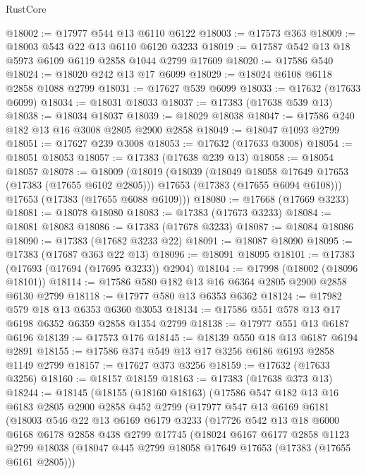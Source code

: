 \begin{lexlean}{RustCore}
\begin{coremodule}
@18002 := @17977 @544 @13 @6110 @6122
@18003 := @17573 @363
@18009 := @18003 @543 @22 @13 @6110 @6120 @3233
@18019 := @17587 @542 @13 @18 @5973 @6109 @6119 @2858 @1044 @2799 @17609
@18020 := @17586 @540
@18024 := @18020 @242 @13 @17 @6099
@18029 := @18024 @6108 @6118 @2858 @1088 @2799
@18031 := @17627 @539 @6099
@18033 := @17632 (@17633 @6099)
@18034 := @18031 @18033
@18037 := @17383 (@17638 @539 @13)
@18038 := @18034 @18037
@18039 := @18029 @18038
@18047 := @17586 @240 @182 @13 @16 @3008 @2805 @2900 @2858
@18049 := @18047 @1093 @2799
@18051 := @17627 @239 @3008
@18053 := @17632 (@17633 @3008)
@18054 := @18051 @18053
@18057 := @17383 (@17638 @239 @13)
@18058 := @18054 @18057
@18078 := @18009
    (@18019
      (@18039
        (@18049 @18058 @17649 @17653 (@17383 (@17655 @6102 @2805)))
        @17653
        (@17383 (@17655 @6094 @6108)))
      @17653
      (@17383 (@17655 @6088 @6109)))
@18080 := @17668 (@17669 @3233)
@18081 := @18078 @18080
@18083 := @17383 (@17673 @3233)
@18084 := @18081 @18083
@18086 := @17383 (@17678 @3233)
@18087 := @18084 @18086
@18090 := @17383 (@17682 @3233 @22)
@18091 := @18087 @18090
@18095 := @17383 (@17687 @363 @22 @13)
@18096 := @18091 @18095
@18101 := @17383 (@17693 (@17694 (@17695 @3233)) @2904)
@18104 := @17998 (@18002 (@18096 @18101))
@18114 := @17586 @580 @182 @13 @16 @6364 @2805 @2900 @2858 @6130 @2799
@18118 := @17977 @580 @13 @6353 @6362
@18124 := @17982 @579 @18 @13 @6353 @6360 @3053
@18134 := @17586 @551 @578 @13 @17 @6198 @6352 @6359 @2858 @1354 @2799
@18138 := @17977 @551 @13 @6187 @6196
@18139 := @17573 @176
@18145 := @18139 @550 @18 @13 @6187 @6194 @2891
@18155 := @17586 @374 @549 @13 @17 @3256 @6186 @6193 @2858 @1149 @2799
@18157 := @17627 @373 @3256
@18159 := @17632 (@17633 @3256)
@18160 := @18157 @18159
@18163 := @17383 (@17638 @373 @13)
@18244 := @18145
    (@18155
      (@18160 @18163)
      (@17586
        @547
        @182
        @13
        @16
        @6183
        @2805
        @2900
        @2858
        @452
        @2799
        (@17977
          @547
          @13
          @6169
          @6181
          (@18003
            @546
            @22
            @13
            @6169
            @6179
            @3233
            (@17726
              @542
              @13
              @18
              @6000
              @6168
              @6178
              @2858
              @438
              @2799
              @17745
              (@18024
                @6167
                @6177
                @2858
                @1123
                @2799
                @18038
                (@18047 @445 @2799 @18058 @17649 @17653 (@17383 (@17655 @6161 @2805)))

\end{coremodule}
\end{lexlean}
